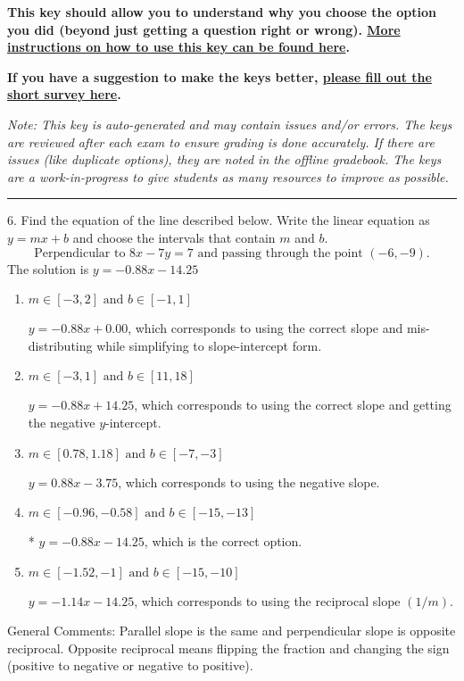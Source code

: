 \documentclass{extbook}[14pt]
\begin{document}
\textbf{This key should allow you to understand why you choose the option you did (beyond just getting a question right or wrong). \href{https://xronos.clas.ufl.edu/mac1105spring2020/courseDescriptionAndMisc/Exams/LearningFromResults}{More instructions on how to use this key can be found here}.}

\textbf{If you have a suggestion to make the keys better, \href{https://forms.gle/CZkbZmPbC9XALEE88}{please fill out the short survey here}.}

\textit{Note: This key is auto-generated and may contain issues and/or errors. The keys are reviewed after each exam to ensure grading is done accurately. If there are issues (like duplicate options), they are noted in the offline gradebook. The keys are a work-in-progress to give students as many resources to improve as possible.}

\rule{\textwidth}{0.4pt}

6. Find the equation of the line described below. Write the linear equation as $ y=mx+b $ and choose the intervals that contain $m$ and $b$.
\[ \text{Perpendicular to } 8 x - 7 y = 7 \text{ and passing through the point } (-6, -9). \] 
The solution is $ y = -0.88x - 14.25 $ 

\begin{enumerate}[label=\Alph*.] 
\item $ m \in [-3, 2] \text{ and } b \in [-1, 1] $ 

  $y = -0.88x + 0.00$, which corresponds to using the correct slope and mis-distributing while simplifying to slope-intercept form. 
\item $ m \in [-3, 1] \text{ and } b \in [11, 18] $ 

  $y = -0.88x + 14.25$, which corresponds to using the correct slope and getting the negative $y$-intercept. 
\item $ m \in [0.78, 1.18] \text{ and } b \in [-7, -3] $ 

  $y = 0.88x - 3.75$, which corresponds to using the negative slope. 
\item $ m \in [-0.96, -0.58] \text{ and } b \in [-15, -13] $ 

 * $y = -0.88x - 14.25$, which is the correct option. 
\item $ m \in [-1.52, -1] \text{ and } b \in [-15, -10] $ 

  $y = -1.14x - 14.25$, which corresponds to using the reciprocal slope $(1/m)$. 
\end{enumerate} 
 
General Comments: Parallel slope is the same and perpendicular slope is opposite reciprocal. Opposite reciprocal means flipping the fraction and changing the sign (positive to negative or negative to positive).
\end{document}
